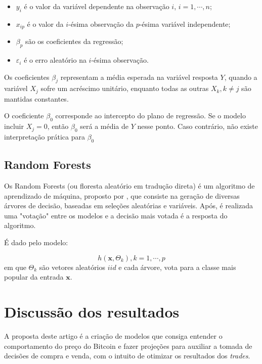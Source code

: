 \documentclass[12pt]{article}
\begin{document}
\begin{itemize}
  \item $y_i$ é o valor da variável dependente na observação $i$, $i = 1, \cdots, n$;
  \item $x_{ip}$ é o valor da $i$-ésima observação da $p$-ésima variável independente;
  \item $\beta_p$ são os coeficientes da regressão;
  \item $\varepsilon_i$ é o erro aleatório na $i$-ésima observação.
\end{itemize}

Os coeficientes $\beta_j$ representam a média esperada na 
variável resposta $Y$, quando a variável $X_j$ sofre um acréscimo unitário, 
enquanto todas as outras $X_k, k \neq j$ são mantidas constantes.

O coeficiente $\beta_0$ corresponde ao intercepto do plano de regressão. Se o 
modelo incluir $X_j = 0$, então $\beta_0$ será a média de $Y$ nesse ponto.
Caso contrário, não existe interpretação prática para $\beta_0$


\subsection{Random Forests}

Os Random Forests (ou floresta aleatório em tradução direta) é um algoritmo de 
aprendizado de máquina, proposto por \cite{breiman2001random}, que consiste na
geração de diversas árvores de decisão, baseadas em seleções aleatórias e 
variáveis. Após, é realizada uma "votação" entre os modelos e a decisão mais 
votada é a resposta do algoritmo.

É dado pelo modelo:

\begin{equation}
  h(\mathbf{x},\Theta_k), k = 1, \cdots, p
\end{equation}
em que $\Theta_k$ são vetores aleatórios $iid$ e cada árvore, vota para a classe
mais popular da entrada $\mathbf{x}$.

\section{Discussão dos resultados}

A proposta deste artigo é a criação de modelos que consiga entender o
comportamento do preço do Bitcoin e fazer projeções para auxiliar a tomada de
decisões de compra e venda, com o intuito de otimizar os resultados dos 
\textit{trades}.
\end{document}
